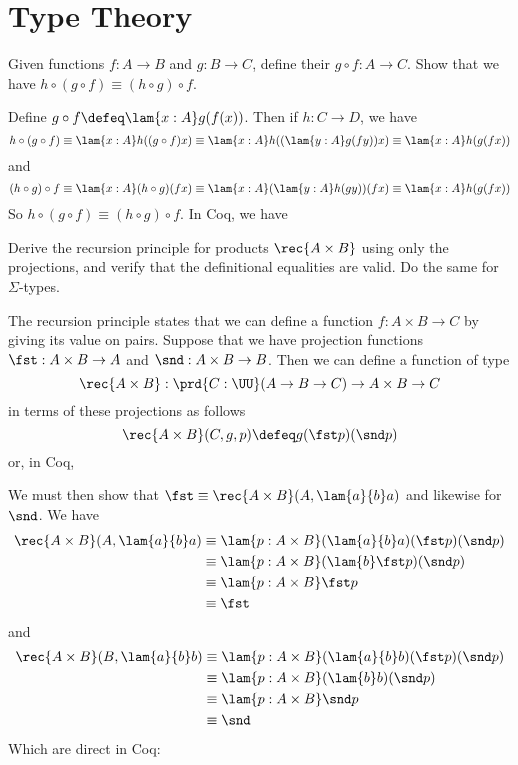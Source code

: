 \newcommand{\coqfile}[2]{}
\section{Type Theory}

  Given functions $f:A\to B$ and $g:B\to C$, define
their  $g \circ f : A \to C$.  Show that we have $h \circ (g
\circ f) \equiv (h \circ g) \circ f$.

\soln
Define $g \circ f \defeq \lam{x:A}g(f(x))$.  Then if $h:C \to D$, we
have
\[
  h \circ (g \circ f) 
  \equiv \lam{x:A}h((g \circ f)x)
  \equiv \lam{x:A}h((\lam{y:A}g(fy))x)
  \equiv \lam{x:A}h(g(fx))
\]
and
\[
  (h \circ g) \circ f 
  \equiv \lam{x:A}(h \circ g)(fx)
  \equiv \lam{x:A}(\lam{y:A}h(gy))(fx)
  \equiv \lam{x:A}h(g(fx))
\]
So $h \circ (g \circ f) \equiv (h \circ g) \circ f$.  In Coq, we have
\coqfile{5}{12}


  Derive the recursion principle for products $\rec{A
  \times B}$ using only the projections, and verify that the definitional
equalities are valid.  Do the same for $\Sigma$-types.

\soln The recursion principle states that we can define a function $f : A
\times B \to C$ by giving its value on pairs.  Suppose that we have projection
functions $\fst : A \times B \to A$ and $\snd : A \times B \to B$.  Then we can
define a function of type
\[
  \rec{A\times B} : \prd{C : \UU} (A \to B \to C) \to A \times B \to C
\]
in terms of these projections as follows
\[
  \rec{A \times B}(C, g, p) \defeq 
  g(\fst p)(\snd p)
\]
or, in Coq,
\coqfile{18}{21}
We must then show that $\fst \equiv \rec{A \times B}(A, \lam{a}{b}a)$ and
likewise for $\snd$.  We have
\begin{align*}
  \rec{A\times B}(A, \lam{a}{b}a)
  &\equiv
  \lam{p : A \times B}(\lam{a}{b}a )(\fst p)(\snd p)
  \\&\equiv
  \lam{p : A \times B}(\lam{b}\fst p )(\snd p)
  \\&\equiv
  \lam{p : A \times B}\fst p 
  \\&\equiv
  \fst
\end{align*}
and
\begin{align*}
  \rec{A \times B}(B, \lam{a}{b}b )
  &\equiv
  \lam{p : A \times B}(\lam{a}{b}b )(\fst p)(\snd p)
  \\&\equiv
  \lam{p : A \times B}(\lam{b}b )(\snd p)
  \\&\equiv
  \lam{p : A \times B}\snd p
  \\&\equiv
  \snd
\end{align*}
Which are direct in Coq:
\coqfile{23}{24}

